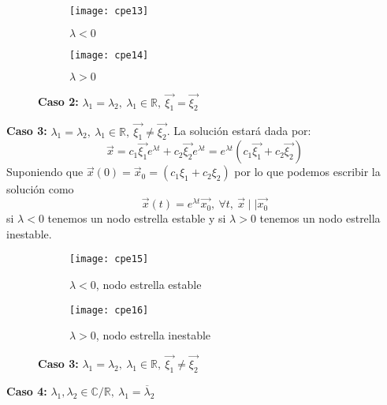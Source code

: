 \begin{figure}[!tbp]
  \begin{subfigure}[b]{0.49\textwidth}
    \texttt{[image: cpe13]}
    \caption{$\lambda<0$}
  \end{subfigure}
  \hfill
  \begin{subfigure}[b]{0.49\textwidth}
    \texttt{[image: cpe14]}
    \caption{$\lambda>0$}
  \end{subfigure}
  \caption{\textbf{Caso 2:} $\lambda_1 = \lambda_2, \ \lambda_1 \in \mathbb{R} , \ \vec{\xi_1}= \vec{\xi_2}$}
\end{figure}
\textbf{Caso 3:} $\lambda_1 = \lambda_2 , \ \lambda_1 \in \mathbb{R}, \ \vec{\xi_1} \neq \vec{\xi_2} $. La solución estará dada por:
$$
\vec{x} = c_1 \vec{\xi_1} e^{\lambda t} + c_2\vec{\xi_2} e^{\lambda t} = e^{\lambda t} (c_1\vec{\xi_1}+c_2\vec{\xi_2})
$$
Suponiendo que $\vec{x}(0)=\vec{x}_0=(c_1\xi_1+c_2\xi_2)$ por lo que podemos escribir la solución como
$$
\vec{x}(t) = e^{\lambda t} \vec{x_0} , \ \forall t , \ \vec{x}  \mid   \mid  \vec{x_0}   
$$
si $\lambda<0$ tenemos un nodo estrella estable y si $\lambda>0$ tenemos un nodo estrella inestable.

\begin{figure}[!tbp]
  \begin{subfigure}[b]{0.49\textwidth}
    \texttt{[image: cpe15]}
    \caption{$\lambda<0$, nodo estrella estable}
  \end{subfigure}
  \hfill
  \begin{subfigure}[b]{0.49\textwidth}
    \texttt{[image: cpe16]}
    \caption{$\lambda>0$, nodo estrella inestable}
  \end{subfigure}
  \caption{\textbf{Caso 3:} $\lambda_1 = \lambda_2 , \ \lambda_1 \in \mathbb{R}, \ \vec{\xi_1} \neq \vec{\xi_2}$}
\end{figure}

\textbf{Caso 4:} $\lambda_1,\lambda_2 \in \mathbb{C}/\mathbb{R},\ \lambda_1=\overline{\lambda}_2$

